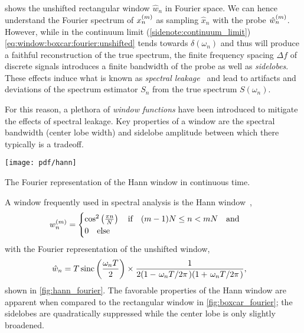  shows the unshifted rectangular window $\hat{w}_n$ in Fourier space.
We can hence understand the Fourier spectrum of $x_n^{(m)}$ as sampling $\hat{x}_n$ with the probe $\hat{w}_n^{(m)}$.
However, while in the continuum limit (\cf \cref{sidenote:continuum_limit}) \cref{eq:window:boxcar:fourier:unshifted} tends towards $\delta(\omega_n)$ and thus will produce a faithful reconstruction of the true spectrum, the finite frequency spacing $\Delta f$ of discrete signals introduces a finite bandwidth of the probe as well as \emph{sidelobes}.
These effects induce what is known as \emph{spectral leakage}~\cite{Harris1978,Koopmans1995} and lead to artifacts and deviations of the spectrum estimator $S_n$ from the true spectrum $S(\omega_n)$.

For this reason, a plethora of \emph{window functions} have been introduced to mitigate the effects of spectral leakage.
Key properties of a window are the spectral bandwidth (center lobe width) and sidelobe amplitude between which there typically is a tradeoff.
\begin{marginfigure}
    \centering
    \texttt{[image: pdf/hann]}
    \caption{The Fourier representation of the Hann window in continuous time.}
    \label{fig:hann_fourier}
\end{marginfigure}
A window frequently used in spectral analysis is the Hann window~\cite{Nuttall1981},
\begin{align}\label{eq:window:hann}
    w_n\gth{m} =
    \begin{cases}
        \cos^2\left(\frac{\pi n}{N}\right)\qif (m - 1)N\leq n < mN\qand \\
        0\qelse
    \end{cases}
\end{align}
with the Fourier representation of the unshifted window,
\begin{align}\label{eq:window:hann:fourier_unshifted}
    \hat{w}_n &=  T\sinc\left(\frac{\omega_n T}{2}\right)\times
                    \frac{1}{2(1 - \flatfrac{\omega_n T}{2\pi})(1 + \flatfrac{\omega_n T}{2\pi})},
\end{align}
shown in \cref{fig:hann_fourier}.
The favorable properties of the Hann window are apparent when compared to the rectangular window in \cref{fig:boxcar_fourier}; the sidelobes are quadratically suppressed while the center lobe is only slightly broadened.

